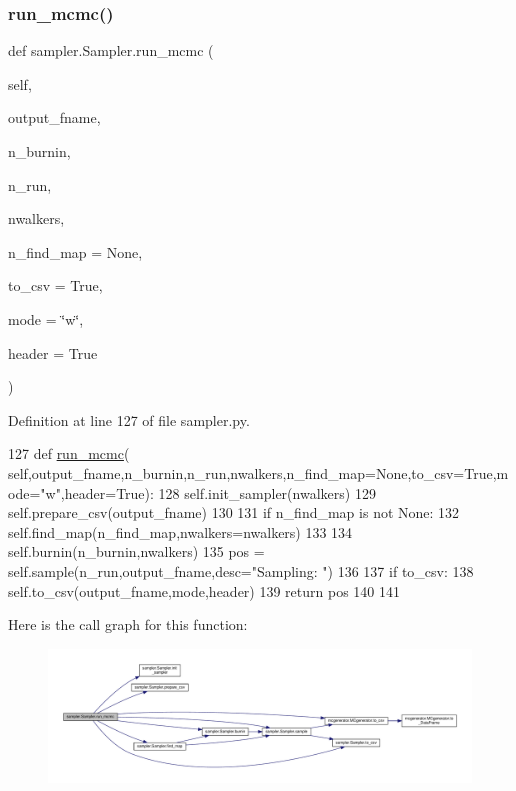 \subsubsection{\texorpdfstring{run\+\_\+mcmc()}{run\_mcmc()}}
{\footnotesize\ttfamily def sampler.\+Sampler.\+run\+\_\+mcmc (\begin{DoxyParamCaption}\item[{}]{self,  }\item[{}]{output\+\_\+fname,  }\item[{}]{n\+\_\+burnin,  }\item[{}]{n\+\_\+run,  }\item[{}]{nwalkers,  }\item[{}]{n\+\_\+find\+\_\+map = {\ttfamily None},  }\item[{}]{to\+\_\+csv = {\ttfamily True},  }\item[{}]{mode = {\ttfamily \char`\"{}w\char`\"{}},  }\item[{}]{header = {\ttfamily True} }\end{DoxyParamCaption})}



Definition at line 127 of file sampler.\+py.


\begin{DoxyCode}
127     \textcolor{keyword}{def }\hyperlink{classsampler_1_1Sampler_ab35f387d6b11e001d006731559e09f56}{run\_mcmc}(
      self,output\_fname,n\_burnin,n\_run,nwalkers,n\_find\_map=None,to\_csv=True,mode="w",header=True):
128         self.init\_sampler(nwalkers)
129         self.prepare\_csv(output\_fname)
130         
131         \textcolor{keywordflow}{if} n\_find\_map \textcolor{keywordflow}{is} \textcolor{keywordflow}{not} \textcolor{keywordtype}{None}:
132             self.find\_map(n\_find\_map,nwalkers=nwalkers)
133 
134         self.burnin(n\_burnin,nwalkers)
135         pos = self.sample(n\_run,output\_fname,desc=\textcolor{stringliteral}{"Sampling: "})
136         
137         \textcolor{keywordflow}{if} to\_csv:
138             self.to\_csv(output\_fname,mode,header)
139         \textcolor{keywordflow}{return} pos
140     
141     
\end{DoxyCode}
Here is the call graph for this function\+:\nopagebreak
\begin{figure}[H]
\begin{center}
\leavevmode
\includegraphics[width=350pt]{d3/d8a/classsampler_1_1Sampler_ab35f387d6b11e001d006731559e09f56_cgraph}
\end{center}
\end{figure}
\mbox{\label{classsampler_1_1Sampler_a93e39e8143affeb3572fdf024bf2d12b}} 
